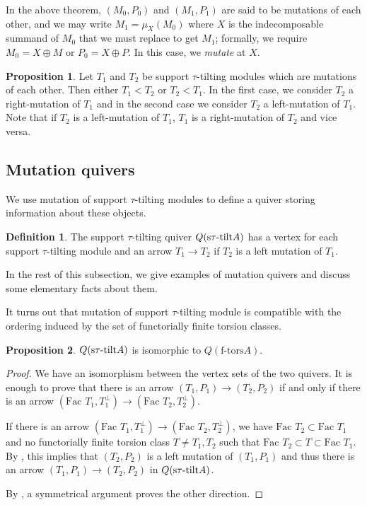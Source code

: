 \documentclass[]{article}
\theoremstyle{definition}
\newtheorem{definition}{Definition}[section]
\newtheorem{proposition}{Proposition}[section]
\newcommand{\tu}{\ensuremath{\tau}}
\newcommand{\Fac}{\ensuremath{\text{Fac }}}
\begin{document}
In the above theorem, $(M_0,P_0)$ and $(M_1,P_1)$ are said to be mutations of each other, and we may write $M_1 = \mu_X(M_0)$ where $X$ is the indecomposable summand of $M_0$ that we must replace to get $M_1$; formally, we require $M_0 = X \oplus M$ or $P_0 = X \oplus P$. In this case, we \textit{mutate} at $X$.

\begin{proposition}\cite[Definition-Proposition 2.28]{tau}
	Let $T_1$ and $T_2$ be support \tu-tilting modules which are mutations of each other. Then either $T_1 < T_2$ or $T_ 2 < T_1$. In the first case, we consider $T_2$ a right-mutation of $T_1$ and in the second case we consider $T_2$ a left-mutation of $T_1$. Note that if $T_2$ is a left-mutation of $T_1$, $T_1$ is a right-mutation of $T_2$ and vice versa.
\end{proposition}

\subsection{Mutation quivers}
We use mutation of support \tu-tilting modules to define a quiver storing information about these objects.

\begin{definition}
	The support $\tau$-tilting quiver $Q(\text{s\tu-tilt} A)$ has a vertex for each support \tu-tilting module and an arrow $T_1 \to T_2$ if $T_2$ is a left mutation of $T_1$. 
\end{definition}

In the rest of this subsection, we give examples of mutation quivers and discuss some elementary facts about them.


It turns out that mutation of support \tu-tilting module is compatible with the ordering induced by the set of functorially finite torsion classes.
\begin{proposition}
	$Q(\text{s\tu-tilt} A)$ is isomorphic to $Q(\text{f-tors} A)$.
\end{proposition}

\begin{proof}
	We have an isomorphism between the vertex sets of the two quivers. It is enough to prove that there is an arrow $(T_1,P_1) \to (T_2,P_2)$ if and only if there is an arrow $(\Fac T_1,T_1^\perp) \to (\Fac T_2,T_2^\perp)$.
	
	If there is an arrow $(\Fac T_1,T_1^\perp) \to (\Fac T_2,T_2^\perp)$, we have $\Fac T_2 \subset \Fac T_1$ and no functorially finite torsion class $T \neq T_1,T_2$ such that $\Fac T_2 \subset T \subset \Fac T_1$. By \cite[Theorem 2.33]{tau}, this implies that $(T_2,P_2)$ is a left mutation of $(T_1,P_1)$ and thus there is an arrow $(T_1,P_1) \to (T_2,P_2)$ in $Q(\text{s\tu-tilt} A)$.
	
	By \cite[Theorem 2.33]{tau}, a symmetrical argument proves the other direction.	
\end{proof}
\end{document}
